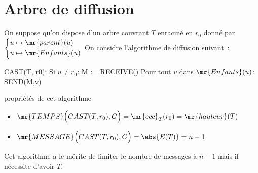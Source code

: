 \section{Arbre de diffusion}

On suppose qu'on dispose d'un arbre couvrant $T$ enraciné en $r_0$ donné par $\begin{cases*}u \mapsto \mr{parent}(u) \\ u \mapsto \mr{Enfants}(u) \end{cases*}$
On considre l'algorithme de diffusion suivant~:

\begin{lstLNat}
    CAST(T, r0):
      Si $u \neq r_0$: 
        M := RECEIVE()
      Pour tout $v$ dans $\mr{Enfants}(u)$:
        SEND(M,v)
\end{lstLNat}

\begin{proposition}{}{propriétés de cet algorithme}
  \begin{itemize}
    \item $\mr{TEMPS}\Big(CAST(T,r_0),G\Big) = \mr{ecc}_T(r_0) = \mr{hauteur}(T)$
    \item $\mr{MESSAGE}\Big(CAST(T,r_0),G\Big) = \abs{E(T)} = n-1$
  \end{itemize}
\end{proposition}

Cet algorithme a le mérite de limiter le nombre de messages à $n-1$ mais il nécessite d'avoir $T$. 

